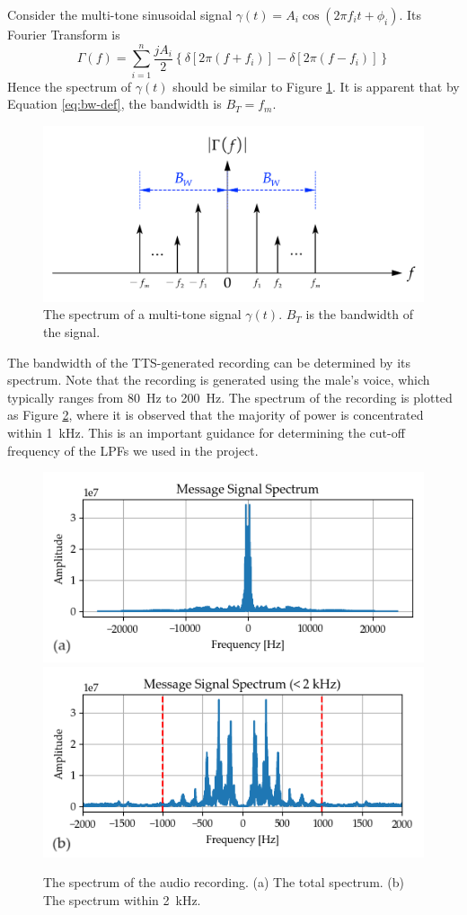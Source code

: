 \documentclass[../ECE459FinalProjectReport.tex]{subfiles}
\begin{document}
Consider the multi-tone sinusoidal signal $\gamma \left(t\right) = A_i\cos\left(2\pi f_i t + \phi_i\right)$. Its Fourier Transform is
\begin{equation}
    \Gamma \left(f\right) = \sum_{i=1}^{n} \frac{jA_i}{2}\left\lbrace \delta\left[ 2\pi \left(f + f_i \right)\right] - \delta\left[ 2\pi \left(f - f_i \right)\right]\right\rbrace
\end{equation}
Hence the spectrum of $\gamma\left(t\right)$ should be similar to Figure \ref{fig:multi-tone-spectrum}. It is apparent that by Equation \eqref{eq:bw-def}, the bandwidth is $B_T = f_m$.
\begin{figure}[tb]
    \centering
    \includegraphics[scale=.35]{plots/multi-tone_spectrum.pdf}
    \caption{The spectrum of a multi-tone signal $\gamma\left(t\right)$. $B_T$ is the bandwidth of the signal.}
    \label{fig:multi-tone-spectrum}
\end{figure}

The bandwidth of the TTS-generated recording can be determined by its spectrum. Note that the recording is generated using the male's voice, which typically ranges from \SI{80}{Hz} to \SI{200}{\Hz}. The spectrum of the recording is plotted as Figure \ref{fig:audio-spectrum}, where it is observed that the majority of power is concentrated within \SI{1}{kHz}. This is an important guidance for determining the cut-off frequency of the LPFs we used in the project.
\begin{figure}[tb]
    \centering
    \includegraphics[width=0.49\linewidth]{plots/audio_spectrum.png}
    \includegraphics[width=0.49\linewidth]{plots/audio_spectrum_2khz.png}
    \caption{The spectrum of the audio recording. (a) The total spectrum. (b) The spectrum within \SI{2}{kHz}.}
    \label{fig:audio-spectrum}
\end{figure}
\end{document}

